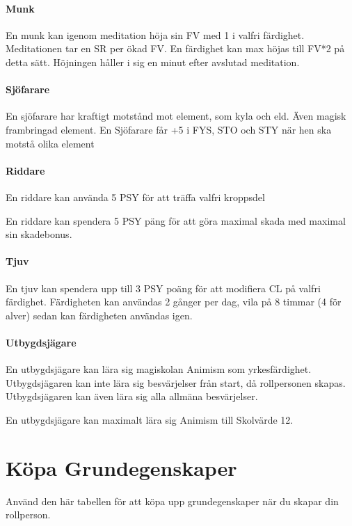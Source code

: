 \documentclass[a4paper, 10pt, titlepage]{article}
\begin{document}
\paragraph{Munk} En munk kan igenom meditation höja sin FV med 1 i valfri färdighet.
Meditationen tar en SR per ökad FV. En färdighet kan max höjas till FV*2 på detta sätt.
Höjningen håller i sig en minut efter avslutad meditation.

\paragraph{Sjöfarare} En sjöfarare har kraftigt motstånd mot element, som kyla och eld.
Även magisk frambringad element. En Sjöfarare får +5 i FYS, STO och STY när hen ska
motstå olika element

\paragraph{Riddare} En riddare kan använda 5 PSY för att träffa valfri kroppsdel

En riddare kan spendera 5 PSY päng för att göra maximal skada med maximal sin skadebonus.

\paragraph{Tjuv} En tjuv kan spendera upp till 3 PSY poäng för att modifiera CL på valfri
färdighet. Färdigheten kan användas 2 gånger per dag, vila på 8 timmar (4 för alver) sedan
kan färdigheten användas igen.

\paragraph{Utbygdsjägare} En utbygdsjägare kan lära sig magiskolan Animism som yrkesfärdighet.
Utbygdsjägaren kan inte lära sig besvärjelser från start, då rollpersonen skapas.
Utbygdsjägaren kan även lära sig alla allmäna besvärjelser.

En utbygdsjägare kan maximalt lära sig Animism till Skolvärde 12.


\section{Köpa Grundegenskaper}
Använd den här tabellen för att köpa upp grundegenskaper när du
skapar din rollperson.
\end{document}
